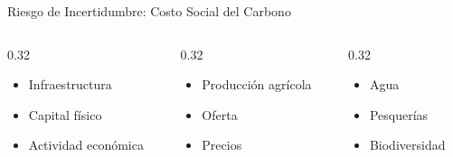 \documentclass[xcolor=dvipsnames]{beamer}
\begin{document}





\begin{frame}{Riesgo de Incertidumbre: Costo Social del Carbono}

\vspace{0.1cm}
\begin{columns}[T]
\begin{column}{0.32\textwidth}
\begin{tcolorbox}[tarjeta=DeepBlue, title={\faCloudRain\ \ Eventos extremos más frecuentes}]
{\scriptsize\begin{itemize}\setlength\itemsep{2pt}
\item Infraestructura \item Capital físico \item Actividad económica
\end{itemize}}
\end{tcolorbox}
\end{column}
\begin{column}{0.32\textwidth}
\begin{tcolorbox}[tarjeta=ClimateGreen, title={\faSeedling\ \ Sequías y cambios en el clima}]
{\scriptsize\begin{itemize}\setlength\itemsep{2pt}
\item Producción agrícola \item Oferta \item Precios
\end{itemize}}
\end{tcolorbox}
\end{column}
\begin{column}{0.32\textwidth}
\begin{tcolorbox}[tarjeta=SoftBlue, title={\faWater\ \ Daños en ecosistemas y recursos naturales}]
{\scriptsize\begin{itemize}\setlength\itemsep{2pt}
\item Agua \item Pesquerías \item Biodiversidad
\end{itemize}}
\end{tcolorbox}
\end{column}
\end{columns}

\end{frame}
\end{document}
